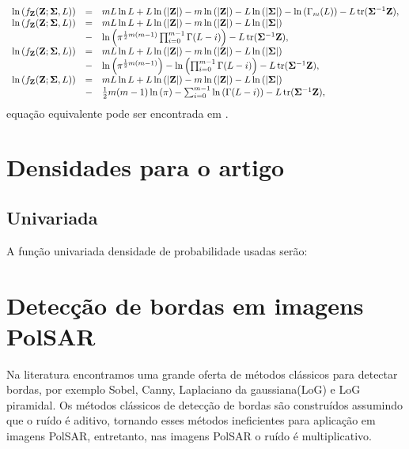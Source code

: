 \begin{equation}\label{cap_acf_12}
\begin{array}{cll}
	\ln{\left(f_{\mathbf{Z}}(\mathbf{Z};\mathbf{\Sigma},L)\right)}&=&mL\ln{L}+L\ln{\left(|\mathbf{Z}|\right)}-m\ln{\left(|\mathbf{Z}|\right)} - L\ln{\left(|\mathbf{\Sigma}|\right)}-\ln{\left(\Gamma_m(L)\right)}-L\operatorname{tr}(\mathbf{\Sigma}^{-1}\mathbf{Z}), \\
	\ln{\left(f_{\mathbf{Z}}(\mathbf{Z};\mathbf{\Sigma},L)\right)}&=&mL\ln{L}+L\ln{\left(|\mathbf{Z}|\right)}-m\ln{\left(|\mathbf{Z}|\right)} - L\ln{\left(|\mathbf{\Sigma}|\right)}\\
	&-&\ln{\left(\pi^{\frac{1}{2}m(m-1)} \prod_{i=0}^{m-1}\Gamma(L-i)\right)}-L\operatorname{tr}(\mathbf{\Sigma}^{-1}\mathbf{Z}),\\
	\ln{\left(f_{\mathbf{Z}}(\mathbf{Z};\mathbf{\Sigma},L)\right)}&=&mL\ln{L}+L\ln{\left(|\mathbf{Z}|\right)}-m\ln{\left(|\mathbf{Z}|\right)} - L\ln{\left(|\mathbf{\Sigma}|\right)}\\
        &-&\ln{\left(\pi^{\frac{1}{2}m(m-1)}\right)}-\ln{\left( \prod_{i=0}^{m-1}\Gamma(L-i)\right)}-L\operatorname{tr}(\mathbf{\Sigma}^{-1}\mathbf{Z}), \\
	\ln{\left(f_{\mathbf{Z}}(\mathbf{Z};\mathbf{\Sigma},L)\right)}&=&mL\ln{L}+L\ln{\left(|\mathbf{Z}|\right)}-m\ln{\left(|\mathbf{Z}|\right)} - L\ln{\left(|\mathbf{\Sigma}|\right)}\\
        &-&\frac{1}{2}m(m-1)\ln{\left(\pi\right)}-\sum_{i=0}^{m-1}\ln{\left(\Gamma(L-i)\right)}-L\operatorname{tr}(\mathbf{\Sigma}^{-1}\mathbf{Z}),\\
\end{array}
\end{equation}
equação equivalente pode ser encontrada em \citep{fnc2011}.

\section{Densidades para o artigo}
\subsection{Univariada}
A função univariada densidade de probabilidade usadas serão:  


\section{Detecção de bordas em imagens PolSAR}\label{cap_acf_sec2}

Na literatura encontramos uma grande oferta de métodos clássicos para detectar bordas, por exemplo Sobel, Canny, Laplaciano da gaussiana(LoG) e LoG piramidal. Os métodos clássicos de detecção de bordas são construídos assumindo que o ruído é aditivo, tornando esses métodos ineficientes para aplicação em imagens PolSAR, entretanto, nas imagens PolSAR o ruído é multiplicativo. 

